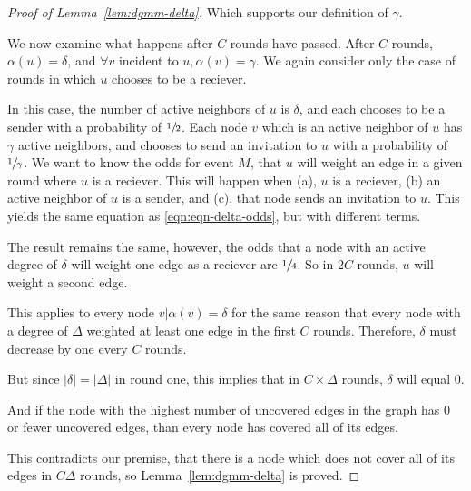 \begin{proof}[Proof of Lemma~\ref{lem:dgmm-delta}]
Which supports our definition of $\gamma$. 

We now examine what happens after $C$ rounds have passed. After $C$ rounds, $\alpha(u) = \delta$, and $\forall v $ incident to $u, \alpha(v) = \gamma$. We again consider only the case of rounds in which $u$ chooses to be a reciever.

In this case, the number of active neighbors of $u$ is $\delta$, and each chooses to be a sender with a probability of $\sfrac{1}{2}$. Each node $v$ which is an active neighbor of $u$ has $\gamma$ active neighbors, and chooses to send an invitation to $u$ with a probability of $\sfrac{1}{\gamma}$. We want to know the odds for event $M$, that $u$ will weight an edge in a given round where $u$ is a reciever. This will happen when (a), $u$ is a reciever, (b) an active neighbor of $u$ is a sender, and (c), that node sends an invitation to $u$. This yields the same equation as \eqref{eqn:eqn-delta-odds}, but with different terms.



The result remains the same, however, the odds that a node with an active degree of $\delta$ will weight one edge as a reciever are $\sfrac{1}{4}$. So in $2C$ rounds, $u$ will weight a second edge.

This applies to every node $v | \alpha(v) = \delta$ for the same reason that every node with a degree of $\Delta$ weighted at least one edge in the first $C$ rounds. Therefore, $\delta$ must decrease by one every $C$ rounds.

But since $|\delta| = |\Delta|$ in round one, this implies that in $C \times \Delta$ rounds, $\delta$ will equal 0. 

And if the node with the highest number of uncovered edges in the graph has 0 or fewer uncovered edges, than every node has covered all of its edges.

This contradicts our premise, that there is a node which does not cover all of its edges in $C\Delta$ rounds, so Lemma~\ref{lem:dgmm-delta} is proved.
\end{proof} 
